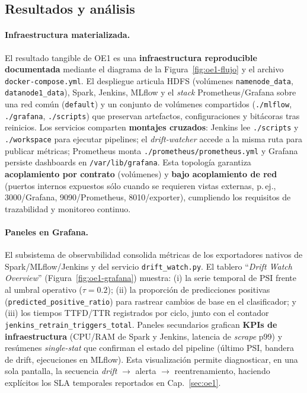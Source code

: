 \subsection{Resultados y análisis}

\paragraph{Infraestructura materializada.}
El resultado tangible de OE1 es una \textbf{infraestructura reproducible documentada} mediante el diagrama de la Figura~\ref{fig:oe1-flujo} y el archivo \texttt{docker-compose.yml}. El despliegue articula HDFS (volúmenes \texttt{namenode\_data}, \texttt{datanode1\_data}), Spark, Jenkins, MLflow y el \textit{stack} Prometheus/Grafana sobre una red común (\texttt{default}) y un conjunto de volúmenes compartidos (\texttt{./mlflow}, \texttt{./grafana}, \texttt{./scripts}) que preservan artefactos, configuraciones y bitácoras tras reinicios. Los servicios comparten \textbf{montajes cruzados}: Jenkins lee \texttt{./scripts} y \texttt{./workspace} para ejecutar pipelines; el \textit{drift-watcher} accede a la misma ruta para publicar métricas; Prometheus monta \texttt{./prometheus/prometheus.yml} y Grafana persiste dashboards en \texttt{/var/lib/grafana}. Esta topología garantiza \textbf{acoplamiento por contrato} (volúmenes) y \textbf{bajo acoplamiento de red} (puertos internos expuestos sólo cuando se requieren vistas externas, p.\,ej., 3000/Grafana, 9090/Prometheus, 8010/exporter), cumpliendo los requisitos de trazabilidad y monitoreo continuo.

\paragraph{Paneles en Grafana.}
El subsistema de observabilidad consolida métricas de los exportadores nativos de Spark/MLflow/Jenkins y del servicio \texttt{drift\_watch.py}. El tablero “\textit{Drift Watch Overview}” (Figura~\ref{fig:oe1-grafana}) muestra: (i) la serie temporal de $\mathrm{PSI}$ frente al umbral operativo ($\tau=0.2$); (ii) la proporción de predicciones positivas (\texttt{predicted\_positive\_ratio}) para rastrear cambios de base en el clasificador; y (iii) los tiempos TTFD/TTR registrados por ciclo, junto con el contador \texttt{jenkins\_retrain\_triggers\_total}. Paneles secundarios grafican \textbf{KPIs de infraestructura} (CPU/RAM de Spark y Jenkins, latencia de \textit{scrape} p99) y resúmenes \textit{single-stat} que confirman el estado del pipeline (último PSI, bandera de drift, ejecuciones en MLflow). Esta visualización permite diagnosticar, en una sola pantalla, la secuencia \textit{drift} $\rightarrow$ alerta $\rightarrow$ reentrenamiento, haciendo explícitos los SLA temporales reportados en Cap.~\ref{sec:oe1}.

